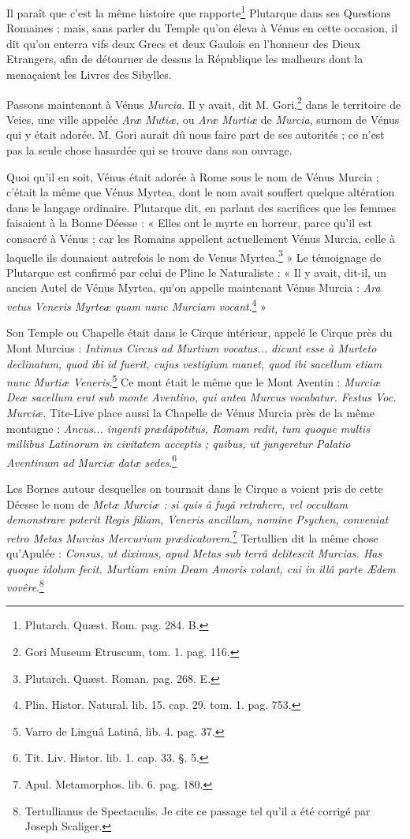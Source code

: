 \documentclass[a4paper, 18pt, oneside]{article}
\begin{document}
Il paraît que c'est la même histoire que rapporte\footnote{Plutarch. Quæst. Rom. pag. 284. B.} Plutarque dans ses Questions Romaines ; mais, sans parler du Temple qu'on éleva à Vénus en cette occasion, il dit qu'on enterra vifs deux Grecs et deux Gaulois en l'honneur des Dieux Etrangers, afin de détourner de dessus la République les malheurs dont la menaçaient les Livres des Sibylles.

Passons maintenant à Vénus \emph{Murcia}. Il y avait, dit M. Gori,\footnote{Gori Museum Etruscum, tom. 1. pag. 116.} dans le territoire de Veies, une ville appelée \emph{Aræ Mutiæ}, ou \emph{Aræ Murtiæ} de \emph{Murcia}, surnom de Vénus qui y était adorée. M. Gori aurait dû nous faire part de ses autorités ; ce n'est pas la seule chose hasardée qui se trouve dans son ouvrage.

Quoi qu'il en soit, Vénus était adorée à Rome sous le nom de Vénus Murcia ; c'était la même que Vénus Myrtea, dont le nom avait souffert quelque altération dans le langage ordinaire. Plutarque dit, en parlant des sacrifices que les femmes faisaient à la Bonne Déesse : « Elles ont le myrte en horreur, parce qu'il est consacré à Vénus ; car les Romains appellent actuellement Vénus Murcia, celle à laquelle ils donnaient autrefois le nom de Venus Myrtea.\footnote{Plutarch. Quæst. Roman. pag. 268. E.} » Le témoignage de Plutarque est confirmé par celui de Pline le Naturaliste : « Il y avait, dit-il, un ancien Autel de Vénus Myrtea, qu'on appelle maintenant Vénus Murcia : \emph{Ara vetus Veneris Myrteæ quam nunc Murciam vocant}.\footnote{Plin. Histor. Natural. lib. 15. cap. 29. tom. 1. pag. 753.} »

Son Temple ou Chapelle était dans le Cirque intérieur, appelé le Cirque près du Mont Murcius : \emph{Intimus Circus ad Murtium vocatus... dicunt esse à Murteto declinatum, quod ibi id fuerit, cujus vestigium manet, quod ibi sacellum etiam nunc Murtiæ Veneris}.\footnote{Varro de Linguâ Latinâ, lib. 4. pag. 37.} Ce mont était le même que le Mont Aventin : \emph{Murciæ Deæ sacellum erat sub monte Aventino, qui antea Murcus vocabatur. Festus Voc. Murciæ.} Tite-Live place aussi la Chapelle de Vénus Murcia près de la même montagne : \emph{Ancus... ingenti prædâpotitus, Romam redit, tum quoque multis millibus Latinorum in civitatem acceptis ; quibus, ut jungeretur Palatio Aventinum ad Murciæ datæ sedes}.\footnote{Tit. Liv. Histor. lib. 1. cap. 33. §. 5.}

Les Bornes autour desquelles on tournait dans le Cirque a voient pris de cette Déesse le nom de \emph{Metæ Murciæ : si quis â fugâ retrahere, vel occultam demonstrare poterit Regis filiam, Veneris ancillam, nomine Psychen, conveniat retro Metas Murcias Mercurium prædicatorem}.\footnote{Apul. Metamorphos. lib. 6. pag. 180.} Tertullien dit la même chose qu'Apulée : \emph{Consus, ut diximus, apud Metas sub terrâ delitescit Murcias. Has quoque idolum fecit. Murtiam enim Deam Amoris volant, cui in illâ parte Ædem vovêre}.\footnote{Tertullianus de Spectaculis. Je cite ce passage tel qu'il a été corrigé par Joseph Scaliger.}
\end{document}
